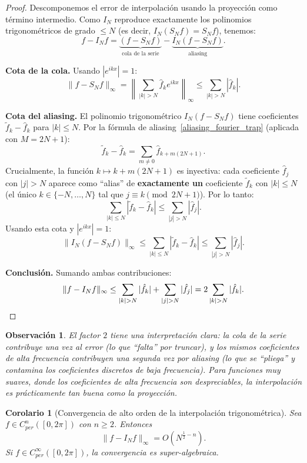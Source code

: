 \documentclass[a4paper,11pt]{report}
\newtheorem{corollary}[theorem]{Corolario}
\newtheorem{remark}[theorem]{Observación}
\begin{document}
\begin{proof}
Descomponemos el error de interpolación usando la proyección como término intermedio. Como $I_N$ reproduce exactamente los polinomios trigonométricos de grado $\leq N$ (es decir, $I_N(S_N f) = S_N f$), tenemos:
\[
f - I_N f = \underbrace{(f - S_N f)}_{\text{cola de la serie}} - \underbrace{I_N(f - S_N f)}_{\text{aliasing}}.
\]

\textbf{Cota de la cola.} Usando $|e^{ikx}| = 1$:
\[
\|f - S_N f\|_\infty = \left\|\sum_{|k| > N} \hat{f}_k e^{ikx}\right\|_\infty \leq \sum_{|k| > N} |\hat{f}_k|.
\]

\textbf{Cota del aliasing.} El polinomio trigonométrico $I_N(f - S_N f)$ tiene coeficientes $\tilde{f}_k - \hat{f}_k$ para $|k| \leq N$. Por la fórmula de aliasing~\eqref{aliasing_fourier_trap} (aplicada con $M=2N+1$):
\[
\tilde{f}_k - \hat{f}_k = \sum_{m \neq 0} \hat{f}_{k + m(2N+1)}.
\]
Crucialmente, la función $k \mapsto k + m(2N+1)$ es inyectiva: cada coeficiente $\hat{f}_j$ con $|j| > N$ aparece como ``alias'' de \textbf{exactamente un} coeficiente $\tilde{f}_k$ con $|k| \leq N$ (el único $k \in \{-N, \ldots, N\}$ tal que $j \equiv k \pmod{2N+1}$). Por lo tanto:
\[
\sum_{|k| \leq N} |\tilde{f}_k - \hat{f}_k| \leq \sum_{|j| > N} |\hat{f}_j|.
\]
Usando esta cota y $|e^{ikx}| = 1$:
\[
\|I_N(f - S_N f)\|_\infty \leq \sum_{|k| \leq N} |\tilde{f}_k - \hat{f}_k| \leq \sum_{|j| > N} |\hat{f}_j|.
\]

\textbf{Conclusión.} Sumando ambas contribuciones:
\[
\|f - I_N f\|_\infty \leq \sum_{|k| > N} |\hat{f}_k| + \sum_{|j| > N} |\hat{f}_j| = 2\sum_{|k| > N} |\hat{f}_k|. \qedhere
\]
\end{proof}

\begin{remark}
El factor $2$ tiene una interpretación clara: la cola de la serie contribuye una vez al error (lo que ``falta'' por truncar), y los mismos coeficientes de alta frecuencia contribuyen una segunda vez por aliasing (lo que se ``pliega'' y contamina los coeficientes discretos de baja frecuencia). Para funciones muy suaves, donde los coeficientes de alta frecuencia son despreciables, la interpolación es prácticamente tan buena como la proyección.
\end{remark}

\begin{corollary}[Convergencia de alto orden de la interpolación trigonométrica]\label{cor:interp_trig_orden_alto}
Sea $f\in C^n_{per}([0,2\pi])$ con $n\ge 2$. Entonces
\[
\|f-I_Nf\|_\infty = O(N^{\frac12-n}).
\]
Si $f\in C^\infty_{per}([0,2\pi])$, la convergencia es super-algebraica.
\end{corollary}
\end{document}
